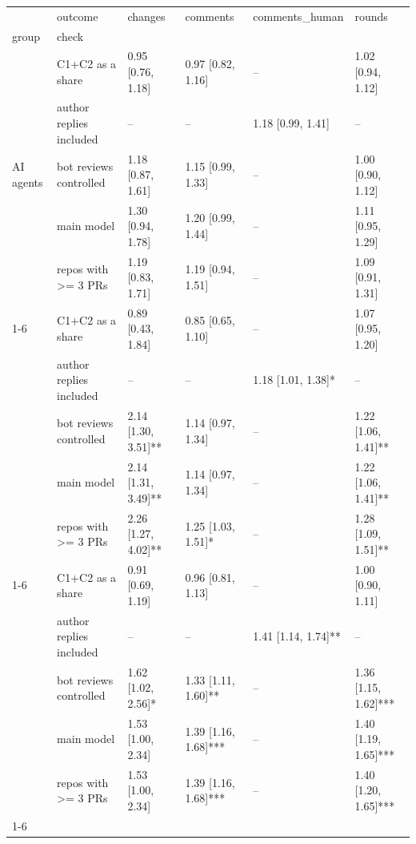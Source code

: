 \begin{tabular}{llllll}
\toprule
 & outcome & changes & comments & comments\_human & rounds \\
group & check &  &  &  &  \\
\midrule
\multirow[t]{5}{*}{AI agents} & C1+C2 as a share & 0.95 [0.76, 1.18] & 0.97 [0.82, 1.16] & -- & 1.02 [0.94, 1.12] \\
 & author replies included & -- & -- & 1.18 [0.99, 1.41] & -- \\
 & bot reviews controlled & 1.18 [0.87, 1.61] & 1.15 [0.99, 1.33] & -- & 1.00 [0.90, 1.12] \\
 & main model & 1.30 [0.94, 1.78] & 1.20 [0.99, 1.44] & -- & 1.11 [0.95, 1.29] \\
 & repos with >= 3 PRs & 1.19 [0.83, 1.71] & 1.19 [0.94, 1.51] & -- & 1.09 [0.91, 1.31] \\
\cline{1-6}
\multirow[t]{5}{*}{Human} & C1+C2 as a share & 0.89 [0.43, 1.84] & 0.85 [0.65, 1.10] & -- & 1.07 [0.95, 1.20] \\
 & author replies included & -- & -- & 1.18 [1.01, 1.38]* & -- \\
 & bot reviews controlled & 2.14 [1.30, 3.51]** & 1.14 [0.97, 1.34] & -- & 1.22 [1.06, 1.41]** \\
 & main model & 2.14 [1.31, 3.49]** & 1.14 [0.97, 1.34] & -- & 1.22 [1.06, 1.41]** \\
 & repos with >= 3 PRs & 2.26 [1.27, 4.02]** & 1.25 [1.03, 1.51]* & -- & 1.28 [1.09, 1.51]** \\
\cline{1-6}
\multirow[t]{5}{*}{Human (pre-ChatGPT)} & C1+C2 as a share & 0.91 [0.69, 1.19] & 0.96 [0.81, 1.13] & -- & 1.00 [0.90, 1.11] \\
 & author replies included & -- & -- & 1.41 [1.14, 1.74]** & -- \\
 & bot reviews controlled & 1.62 [1.02, 2.56]* & 1.33 [1.11, 1.60]** & -- & 1.36 [1.15, 1.62]*** \\
 & main model & 1.53 [1.00, 2.34] & 1.39 [1.16, 1.68]*** & -- & 1.40 [1.19, 1.65]*** \\
 & repos with >= 3 PRs & 1.53 [1.00, 2.34] & 1.39 [1.16, 1.68]*** & -- & 1.40 [1.20, 1.65]*** \\
\cline{1-6}
\bottomrule
\end{tabular}
